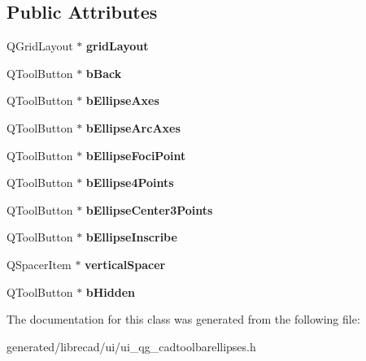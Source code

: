\subsection*{Public Attributes}
\begin{DoxyCompactItemize}
\item 
\hypertarget{classUi__QG__CadToolBarEllipses_afb94215eb0c9c767f0ca6f824f0c3bd3}{Q\-Grid\-Layout $\ast$ {\bfseries grid\-Layout}}\label{classUi__QG__CadToolBarEllipses_afb94215eb0c9c767f0ca6f824f0c3bd3}

\item 
\hypertarget{classUi__QG__CadToolBarEllipses_a4ca85d17c29c08c051da7392a321c0d8}{Q\-Tool\-Button $\ast$ {\bfseries b\-Back}}\label{classUi__QG__CadToolBarEllipses_a4ca85d17c29c08c051da7392a321c0d8}

\item 
\hypertarget{classUi__QG__CadToolBarEllipses_adfcfe913ea0068a79436db236947836b}{Q\-Tool\-Button $\ast$ {\bfseries b\-Ellipse\-Axes}}\label{classUi__QG__CadToolBarEllipses_adfcfe913ea0068a79436db236947836b}

\item 
\hypertarget{classUi__QG__CadToolBarEllipses_a9cefbdb9408ce9ef0a00ea04d84468fc}{Q\-Tool\-Button $\ast$ {\bfseries b\-Ellipse\-Arc\-Axes}}\label{classUi__QG__CadToolBarEllipses_a9cefbdb9408ce9ef0a00ea04d84468fc}

\item 
\hypertarget{classUi__QG__CadToolBarEllipses_aab2618cfb32f04ef86c3fd4b4eeaf28d}{Q\-Tool\-Button $\ast$ {\bfseries b\-Ellipse\-Foci\-Point}}\label{classUi__QG__CadToolBarEllipses_aab2618cfb32f04ef86c3fd4b4eeaf28d}

\item 
\hypertarget{classUi__QG__CadToolBarEllipses_ae27a181311019667f5452fa4390aee44}{Q\-Tool\-Button $\ast$ {\bfseries b\-Ellipse4\-Points}}\label{classUi__QG__CadToolBarEllipses_ae27a181311019667f5452fa4390aee44}

\item 
\hypertarget{classUi__QG__CadToolBarEllipses_adc3350f643b086d77b91c03911e281a5}{Q\-Tool\-Button $\ast$ {\bfseries b\-Ellipse\-Center3\-Points}}\label{classUi__QG__CadToolBarEllipses_adc3350f643b086d77b91c03911e281a5}

\item 
\hypertarget{classUi__QG__CadToolBarEllipses_a4899fa90ea7a81a59e7e71c459d3805e}{Q\-Tool\-Button $\ast$ {\bfseries b\-Ellipse\-Inscribe}}\label{classUi__QG__CadToolBarEllipses_a4899fa90ea7a81a59e7e71c459d3805e}

\item 
\hypertarget{classUi__QG__CadToolBarEllipses_a7c12c2b79cee88281f00b346ce241f35}{Q\-Spacer\-Item $\ast$ {\bfseries vertical\-Spacer}}\label{classUi__QG__CadToolBarEllipses_a7c12c2b79cee88281f00b346ce241f35}

\item 
\hypertarget{classUi__QG__CadToolBarEllipses_a5678ff7ae608ef5f00a8650b3c5bae2d}{Q\-Tool\-Button $\ast$ {\bfseries b\-Hidden}}\label{classUi__QG__CadToolBarEllipses_a5678ff7ae608ef5f00a8650b3c5bae2d}

\end{DoxyCompactItemize}


The documentation for this class was generated from the following file\-:\begin{DoxyCompactItemize}
\item 
generated/librecad/ui/ui\-\_\-qg\-\_\-cadtoolbarellipses.\-h\end{DoxyCompactItemize}
